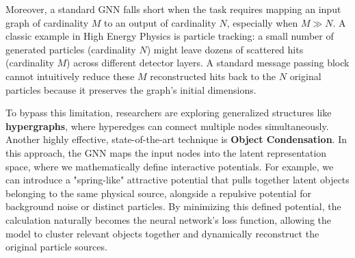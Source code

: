 Moreover, a standard GNN falls short when the task requires mapping an input graph of cardinality $M$ to an output of cardinality $N$, especially when $M \gg N$. A classic example in High Energy Physics is particle tracking: a small number of generated particles (cardinality $N$) might leave dozens of scattered hits (cardinality $M$) across different detector layers. A standard message passing block cannot intuitively reduce these $M$ reconstructed hits back to the $N$ original particles because it preserves the graph's initial dimensions.

To bypass this limitation, researchers are exploring generalized structures like \textbf{hypergraphs}, where hyperedges can connect multiple nodes simultaneously. Another highly effective, state-of-the-art technique is \textbf{Object Condensation}. In this approach, the GNN maps the input nodes into the latent representation space, where we mathematically define interactive potentials. For example, we can introduce a "spring-like" attractive potential that pulls together latent objects belonging to the same physical source, alongside a repulsive potential for background noise or distinct particles. By minimizing this defined potential, the calculation naturally becomes the neural network's loss function, allowing the model to cluster relevant objects together and dynamically reconstruct the original particle sources.

